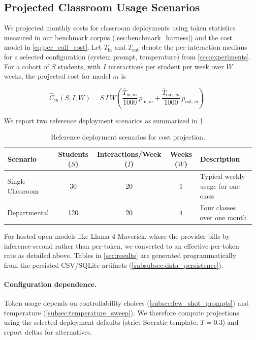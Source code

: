 \subsection{Projected Classroom Usage Scenarios}\label{subsec:projected_scenarios}

We projected monthly costs for classroom deployments using token statistics measured in our benchmark corpus (\cref{sec:benchmark_harness}) and the cost model in \cref{eq:per_call_cost}. Let $\bar{T}_{\text{in}}$ and $\bar{T}_{\text{out}}$ denote the per-interaction medians for a selected configuration (system prompt, temperature) from \cref{sec:experiments}. For a cohort of $S$ students, with $I$ interactions per student per week over $W$ weeks, the projected cost for model $m$ is

\begin{equation}
\label{eq:scenario_cost}
\widehat{C}_m(S, I, W) 
= S\, I\, W \left( \frac{\bar{T}_{\text{in},m}}{1000}\, p_{\text{in},m} + \frac{\bar{T}_{\text{out},m}}{1000}\, p_{\text{out},m} \right).
\end{equation}

We report two reference deployment scenarios as summarized in \cref{tab:deployment_scenarios}.

\begin{table}[t]
\centering
\caption{Reference deployment scenarios for cost projection.}
\label{tab:deployment_scenarios}
\begin{tabularx}{\textwidth}{@{}l c c c X@{}}
\toprule
\textbf{Scenario} & \textbf{Students ($S$)} & \textbf{Interactions/Week ($I$)} & \textbf{Weeks ($W$)} & \textbf{Description} \\ \midrule
Single Classroom & 30 & 20 & 1 & Typical weekly usage for one class \\
Departmental & 120 & 20 & 4 & Four classes over one month \\ \bottomrule
\end{tabularx}
\end{table}

\FloatBarrier

For hosted open models like Llama 4 Maverick, where the provider bills by inference-second rather than per-token, we converted to an effective per-token rate as detailed above. Tables in \cref{sec:results} are generated programmatically from the persisted CSV/SQLite artifacts (\cref{subsubsec:data_persistence}).

\paragraph{Configuration dependence.} Token usage depends on controllability choices (\cref{subsec:few_shot_prompts}) and temperature (\cref{subsec:temperature_sweep}). We therefore compute projections using the selected deployment defaults (strict Socratic template; $T=0.3$) and report deltas for alternatives.

